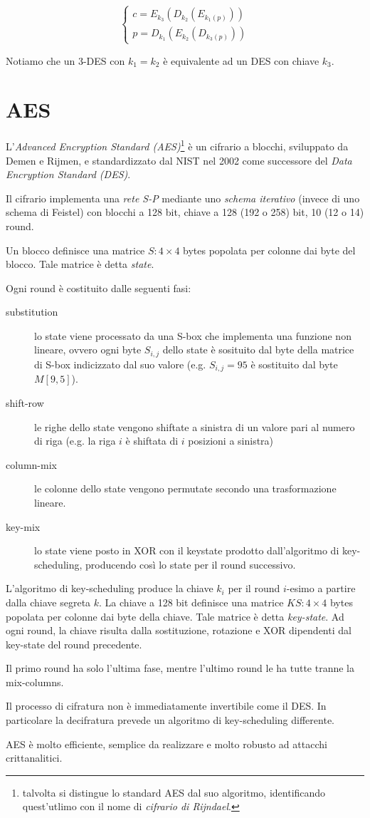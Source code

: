 $$
\begin{cases}
  c=E_{k_{3}}(D_{k_{2}}(E_{k_{1}(p)}))\\
  p=D_{k_{1}}(E_{k_{2}}(D_{k_{3}(p)}))
\end{cases}
$$

Notiamo che un 3-DES con $k_{1}=k_{2}$ è equivalente ad un DES con chiave $k_{3}$.

\section{AES}
L'\textit{Advanced Encryption Standard (AES)}\footnote{talvolta si distingue lo standard AES dal suo algoritmo, identificando quest'utlimo con il nome di \textit{cifrario di Rijndael}.} è un cifrario a blocchi, sviluppato da Demen e Rijmen, e standardizzato dal NIST nel 2002 come successore del \textit{Data Encryption Standard (DES)}.

Il cifrario implementa una \textit{rete S-P} mediante uno \textit{schema iterativo} (invece di uno schema di Feistel) con blocchi a 128 bit, chiave a 128 (192 o 258) bit, 10 (12 o 14) round.

Un blocco definisce una matrice $S:4 \times 4$ bytes popolata per colonne dai byte del blocco. Tale matrice è detta \textit{state}.

Ogni round è costituito dalle seguenti fasi:

\begin{description}
  \item[substitution] lo state viene processato da una S-box che implementa una funzione non lineare, ovvero ogni byte $S_{i,j}$ dello state è sosituito dal byte della matrice di S-box indicizzato dal suo valore (e.g. $S_{i,j}=95$ è sostituito dal byte $M[9,5]$).
  \item[shift-row] le righe dello state vengono shiftate a sinistra di un valore pari al numero di riga (e.g. la riga $i$ è shiftata di $i$ posizioni a sinistra)
  \item[column-mix] le colonne dello state vengono permutate secondo una trasformazione lineare.
  \item[key-mix] lo state viene posto in XOR con il keystate prodotto dall'algoritmo di key-scheduling, producendo così lo state per il round successivo.
\end{description}

L'algoritmo di key-scheduling produce la chiave $k_{i}$ per il round $i$-esimo a partire dalla chiave segreta $k$.
La chiave a 128 bit definisce una matrice $KS:4 \times 4$ bytes popolata per colonne dai byte della chiave. Tale matrice è detta \textit{key-state}. Ad ogni round, la chiave risulta dalla sostituzione, rotazione e XOR dipendenti dal key-state del round precedente.

Il primo round ha solo l'ultima fase, mentre l'ultimo round le ha tutte tranne la mix-columns.

Il processo di cifratura non è immediatamente invertibile come il DES. In particolare la decifratura prevede un algoritmo di key-scheduling differente.

AES è molto efficiente, semplice da realizzare e molto robusto ad attacchi crittanalitici.
